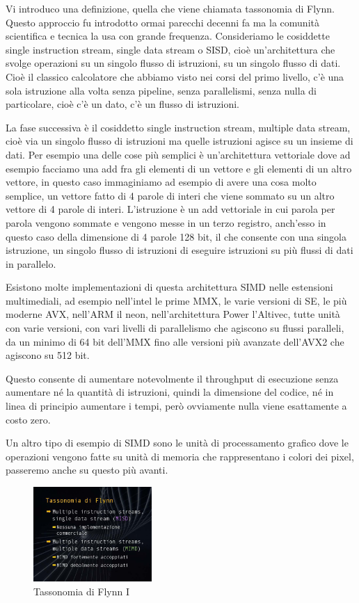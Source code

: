Vi introduco una definizione, quella che viene chiamata tassonomia di Flynn.
Questo approccio fu introdotto ormai parecchi decenni fa ma la comunità scientifica e tecnica la usa con grande frequenza.
Consideriamo le cosiddette single instruction stream, single data stream o SISD, cioè un'architettura che svolge operazioni su un singolo flusso di istruzioni, su un singolo flusso di dati.
Cioè il classico calcolatore che abbiamo visto nei corsi del primo livello, c'è una sola istruzione alla volta senza pipeline, senza parallelismi, senza nulla di particolare, cioè c'è un dato, c'è un flusso di istruzioni.

La fase successiva è il cosiddetto single instruction stream, multiple data stream, cioè via un singolo flusso di istruzioni ma quelle istruzioni agisce su un insieme di dati.
Per esempio una delle cose più semplici è un'architettura vettoriale dove ad esempio facciamo una add fra gli elementi di un vettore e gli elementi di un altro vettore, in questo caso immaginiamo ad esempio di avere una cosa molto semplice, un vettore fatto di 4 parole di interi che viene sommato su un altro vettore di 4 parole di interi.
L'istruzione è un add vettoriale in cui parola per parola vengono sommate e vengono messe in un terzo registro, anch'esso in questo caso della dimensione di 4 parole 128 bit, il che consente con una singola istruzione, un singolo flusso di istruzioni di eseguire istruzioni su più flussi di dati in parallelo.

Esistono molte implementazioni di questa architettura SIMD nelle estensioni multimediali, ad esempio nell'intel le prime MMX, le varie versioni di SE, le più moderne AVX, nell'ARM il neon, nell'architettura Power l'Altivec, tutte unità con varie versioni, con vari livelli di parallelismo che agiscono su flussi paralleli, da un minimo di 64 bit dell'MMX fino alle versioni più avanzate dell'AVX2 che agiscono su 512 bit.

Questo consente di aumentare notevolmente il throughput di esecuzione senza aumentare né la quantità di istruzioni, quindi la dimensione del codice, né in linea di principio aumentare i tempi, però ovviamente nulla viene esattamente a costo zero.

Un altro tipo di esempio di SIMD sono le unità di processamento grafico dove le operazioni vengono fatte su unità di memoria che rappresentano i colori dei pixel, passeremo anche su questo più avanti.

\FloatBarrier
\begin{figure}[H]
  \centering
  \includegraphics[width=0.40\textwidth,
                    trim=40 40 10 40, %
                    clip]
                    {images/Lez03_p02_fig_06.png}
  \caption{Tassonomia di Flynn I}
  \label{fig:Lez03_p02_fig_06}
\end{figure}
\FloatBarrier
\noindent


